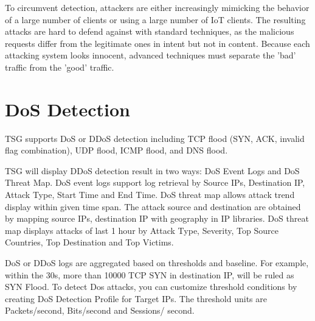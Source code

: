 To circumvent detection, attackers are either increasingly mimicking the behavior of a large number of clients or using a large number of IoT clients. 
The resulting attacks are hard to defend against with standard techniques, as the malicious requests differ from the legitimate ones in intent but not in content. 
Because each attacking system looks innocent, advanced techniques must separate the 'bad' traffic from the 'good' traffic. 


\section*{\hypertarget{link:DoS Detection}{DoS Detection}}
\label{sec:DoS:detection}
TSG supports DoS or DDoS detection including TCP flood (SYN, ACK, invalid flag combination), UDP flood, ICMP flood, and DNS flood.


TSG will display DDoS detection result in two ways: DoS Event Logs and DoS Threat Map. DoS event logs support log retrieval by 
Source IPs, Destination IP, Attack Type, Start Time and End Time. DoS threat map allows attack trend display within given time span. 
The attack source and destination are obtained by mapping source IPs, destination IP with geography in IP libraries. 
DoS threat map displays attacks of last 1 hour by Attack Type, Severity, Top Source Countries, Top Destination and Top Victims. 


DoS or DDoS logs are aggregated based on thresholds and baseline. For example, within the 30s, more than 10000 TCP SYN in destination IP, will be ruled as SYN Flood. 
To detect Dos attacks, you can customize threshold conditions by creating DoS Detection Profile for Target IPs. 
The threshold units are Packets/second, Bits/second and Sessions/ second.
